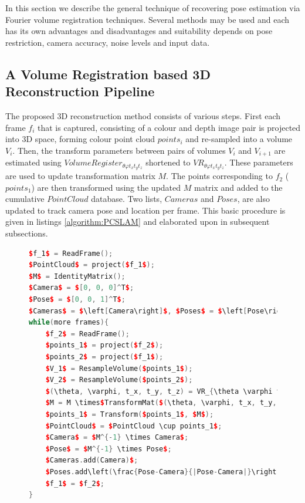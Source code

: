 
In this section we describe the general technique of recovering pose estimation via Fourier volume registration techniques. Several methods may be used and each has its own advantages and disadvantages and suitability depends on pose restriction, camera accuracy, noise levels and input data. 


\subsection{A Volume Registration based 3D Reconstruction Pipeline}

\label{METHOD_SECLL}
The proposed 3D reconstruction method consists of various steps. First each frame $f_i$ that is captured, consisting of a colour and depth image pair is projected into 3D space, forming colour point cloud $points_i$ and re-sampled into a volume $V_i$. Then, the transform parameters between pairs of volumes $V_i$ and $V_{i+1}$ are estimated using $VolumeRegister_{\theta \varphi t_x t_y t_z}$ shortened to $VR_{\theta \varphi t_x t_y t_z}$. These parameters are used to update transformation matrix $M$. The points corresponding to $f_2$ ($points_1$) are then transformed using the updated $M$ matrix and added to the cumulative $PointCloud$ database. Two lists, $Cameras$ and $Poses$, are also updated to track camera pose and location per frame. This basic procedure is given in listings \ref{algorithm:PCSLAM} and elaborated upon in subsequent subsections.
\begin{figure}
\begin{lstlisting}[language=c++,caption=Phase Correlation Based SLAM Algorithm,label=algorithm:PCSLAM,mathescape,basicstyle=\ttfamily]
$f_1$ = ReadFrame();
$PointCloud$ = project($f_1$);
$M$ = IdentityMatrix();
$Camera$ = $[0, 0, 0]^T$;
$Pose$ = $[0, 0, 1]^T$;
$Cameras$ = $\left[Camera\right]$, $Poses$ = $\left[Pose\right]$;
while(more frames){
	$f_2$ = ReadFrame();
	$points_1$ = project($f_2$);
	$points_2$ = project($f_1$);
	$V_1$ = ResampleVolume($points_1$);
	$V_2$ = ResampleVolume($points_2$);
	$(\theta, \varphi, t_x, t_y, t_z) = VR_{\theta \varphi t_x t_y t_z}(V_1, V_2)$;
	$M = M \times$TransformMat($(\theta, \varphi, t_x, t_y, t_z)$);
	$points_1$ = Transform($points_1$, $M$);
	$PointCloud$ = $PointCloud \cup points_1$;
	$Camera$ = $M^{-1} \times Camera$;
	$Pose$ = $M^{-1} \times Pose$;
	$Cameras.add(Camera)$;
	$Poses.add\left(\frac{Pose-Camera}{|Pose-Camera|}\right)$;
	$f_1$ = $f_2$;
}
\end{lstlisting}
\end{figure}


